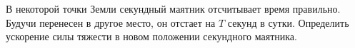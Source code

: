 В некоторой точки Земли секундный маятник отсчитывает время правильно.
Будучи перенесен в другое место, он отстает на $T$ секунд в сутки.
Определить ускорение силы тяжести в новом положении секундного маятника.
